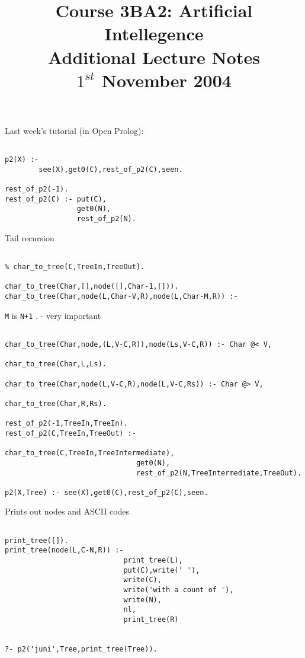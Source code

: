 \documentclass[a4paper,12pt]{article}
\begin{document}
\title{Course 3BA2: Artificial Intellegence \\ Additional Lecture Notes \\ $1^{st}$ November 2004}

\maketitle

Last week's tutorial (in Open Prolog):

\begin{verbatim}

p2(X) :-
        see(X),get0(C),rest_of_p2(C),seen.

rest_of_p2(-1).
rest_of_p2(C) :- put(C),
                 get0(N),
                 rest_of_p2(N).

\end{verbatim}

Tail recursion

\begin{verbatim}

% char_to_tree(C,TreeIn,TreeOut).

char_to_tree(Char,[],node([],Char-1,[])).
char_to_tree(Char,node(L,Char-V,R),node(L,Char-M,R)) :-

\end{verbatim}

\verb!M! is \verb!N+1! . - very important

\begin{verbatim}

char_to_tree(Char,node,(L,V-C,R)),node(Ls,V-C,R)) :- Char @< V,
                                                      char_to_tree(Char,L,Ls).

char_to_tree(Char,node(L,V-C,R),node(L,V-C,Rs)) :- Char @> V,
                                                   char_to_tree(Char,R,Rs).

rest_of_p2(-1,TreeIn,TreeIn).
rest_of_p2(C,TreeIn,TreeOut) :-
                               char_to_tree(C,TreeIn,TreeIntermediate),
                               get0(N),
                               rest_of_p2(N,TreeIntermediate,TreeOut).

p2(X,Tree) :- see(X),get0(C),rest_of_p2(C),seen.

\end{verbatim}

Prints out nodes and ASCII codes

\begin{verbatim}

print_tree([]).
print_tree(node(L,C-N,R)) :-
                            print_tree(L),
                            put(C),write(' '),
                            write(C),
                            write('with a count of '),
                            write(N),
                            nl,
                            print_tree(R)


?- p2('juni',Tree,print_tree(Tree)).

\end{verbatim}
\end{document}
